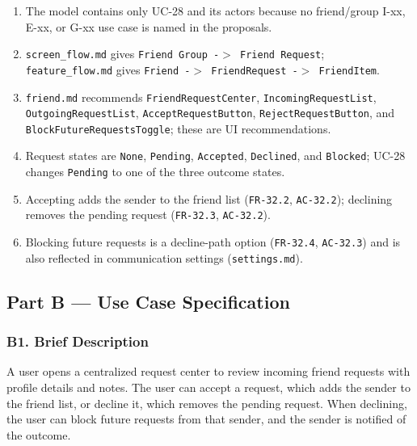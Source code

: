 \documentclass[12pt]{article}
\begin{document}
\begin{enumerate}
\item The model contains only UC-28 and its actors because no friend/group I-xx, E-xx, or G-xx use case is named in the proposals.
\item \texttt{screen\_flow.md} gives \texttt{Friend Group -$>$ Friend Request}; \texttt{feature\_flow.md} gives \texttt{Friend -$>$ FriendRequest -$>$ FriendItem}.
\item \texttt{friend.md} recommends \texttt{FriendRequestCenter}, \texttt{IncomingRequestList}, \texttt{OutgoingRequestList}, \texttt{AcceptRequestButton}, \texttt{RejectRequestButton}, and \texttt{BlockFutureRequestsToggle}; these are UI recommendations.
\item Request states are \texttt{None}, \texttt{Pending}, \texttt{Accepted}, \texttt{Declined}, and \texttt{Blocked}; UC-28 changes \texttt{Pending} to one of the three outcome states.
\item Accepting adds the sender to the friend list (\texttt{FR-32.2}, \texttt{AC-32.2}); declining removes the pending request (\texttt{FR-32.3}, \texttt{AC-32.2}).
\item Blocking future requests is a decline-path option (\texttt{FR-32.4}, \texttt{AC-32.3}) and is also reflected in communication settings (\texttt{settings.md}).
\end{enumerate}
\par\medskip

\hypertarget{sec:part-b-use-case-specification}{}
\subsection*{Part B --- Use Case Specification}
\par\medskip

\hypertarget{sec:b1-brief-description}{}
\subsubsection*{B1. Brief Description}
\par\medskip

A user opens a centralized request center to review incoming friend requests with profile details and notes. The user can accept a request, which adds the sender to the friend list, or decline it, which removes the pending request. When declining, the user can block future requests from that sender, and the sender is notified of the outcome.
\par\medskip
\end{document}
